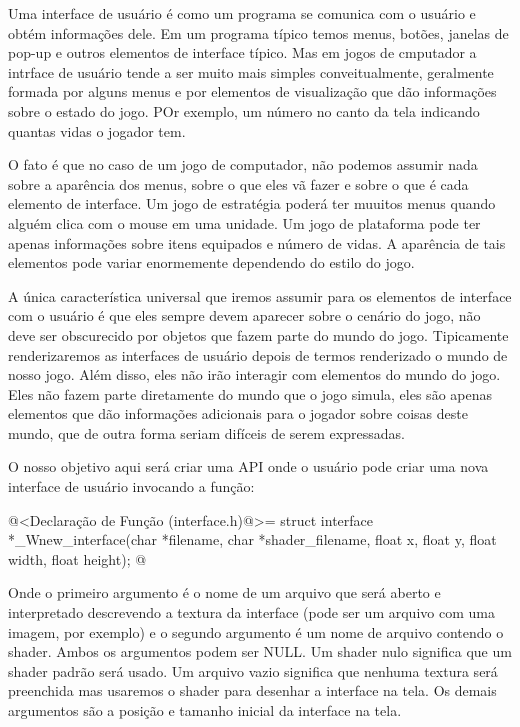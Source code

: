 
Uma interface de usuário é como um programa se comunica com o usuário
e obtém informações dele. Em um programa típico temos menus, botões,
janelas de pop-up e outros elementos de interface típico. Mas em jogos
de cmputador a intrface de usuário tende a ser muito mais simples
conveitualmente, geralmente formada por alguns menus e por elementos
de visualização que dão informações sobre o estado do jogo. POr
exemplo, um número no canto da tela indicando quantas vidas o jogador
tem.

O fato é que no caso de um jogo de computador, não podemos assumir
nada sobre a aparência dos menus, sobre o que eles vã fazer e sobre o
que é cada elemento de interface. Um jogo de estratégia poderá ter
muuitos menus quando alguém clica com o mouse em uma unidade. Um jogo
de plataforma pode ter apenas informações sobre itens equipados e
número de vidas. A aparência de tais elementos pode variar enormemente
dependendo do estilo do jogo.

A única característica universal que iremos assumir para os elementos
de interface com o usuário é que eles sempre devem aparecer sobre o
cenário do jogo, não deve ser obscurecido por objetos que fazem parte
do mundo do jogo. Tipicamente renderizaremos as interfaces de usuário
depois de termos renderizado o mundo de nosso jogo. Além disso, eles
não irão interagir com elementos do mundo do jogo. Eles não fazem
parte diretamente do mundo que o jogo simula, eles são apenas
elementos que dão informações adicionais para o jogador sobre coisas
deste mundo, que de outra forma seriam difíceis de serem expressadas.

O nosso objetivo aqui será criar uma API onde o usuário pode criar uma
nova interface de usuário invocando a função:

\iniciocodigo
@<Declaração de Função (interface.h)@>=
struct interface *_Wnew_interface(char *filename, char *shader_filename,
                                  float x, float y, float width, float height);
@
\fimcodigo

Onde o primeiro argumento é o nome de um arquivo que será aberto e
interpretado descrevendo a textura da interface (pode ser um arquivo
com uma imagem, por exemplo) e o segundo argumento é um nome de
arquivo contendo o shader. Ambos os argumentos podem ser NULL. Um
shader nulo significa que um shader padrão será usado. Um arquivo
vazio significa que nenhuma textura será preenchida mas usaremos o
shader para desenhar a interface na tela. Os demais argumentos são a
posição e tamanho inicial da interface na tela.

